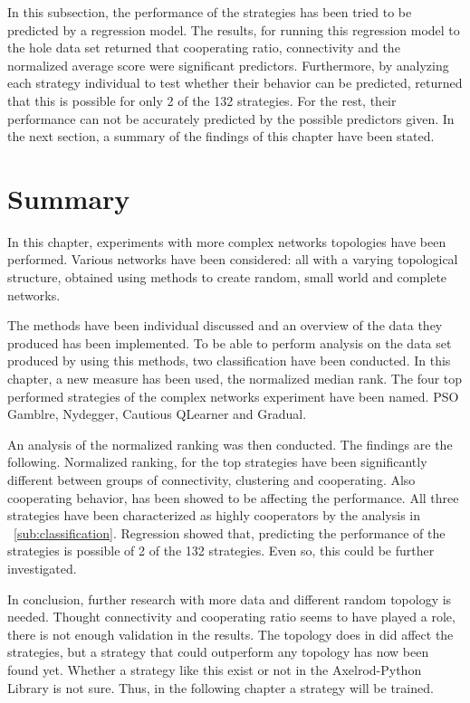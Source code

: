 In this subsection, the performance of the strategies has been tried to be predicted
by a regression model. The results, for running this regression model to the
hole data set returned that cooperating ratio, connectivity and the normalized
average score were significant predictors. Furthermore, by analyzing each strategy
individual to test whether their behavior can be predicted, returned that this
is possible for only 2 of the 132 strategies. For the rest, their performance can not
be accurately predicted by the possible predictors given. In the next section,
a summary of the findings of this chapter have been stated.

\section{Summary}
In this chapter, experiments with more complex networks topologies have been
performed. Various networks have been considered: all with a varying topological
structure, obtained using methods to create random, small world and complete networks.

The methods have been individual discussed and an overview of the data they
produced has been implemented. To be able to perform analysis on the data set
produced by using this methods, two classification have been conducted.
In this chapter, a new measure has been used, the normalized median rank.
The four top performed strategies of the complex networks experiment have
been named. PSO Gamblre, Nydegger, Cautious QLearner and Gradual.

An analysis of the normalized ranking was then conducted. The findings are the
following. Normalized ranking, for the top strategies have been significantly different
between groups of connectivity, clustering and cooperating. Also cooperating behavior, has been showed to
be affecting the performance. All three strategies have been characterized as highly
cooperators by the analysis in ~\autoref{sub:classification}. Regression showed that,
predicting the performance of the strategies is possible of 2 of the 132 strategies.
Even so, this could be further investigated.

In conclusion, further research with more data and different random topology
is needed. Thought connectivity and cooperating ratio seems to have played a role,
there is not enough validation in the results. The topology does in did affect
the strategies, but a strategy that could outperform any topology has now been
found yet. Whether a strategy like this exist or not in the Axelrod-Python Library
is not sure. Thus, in the following chapter a strategy will be trained.
